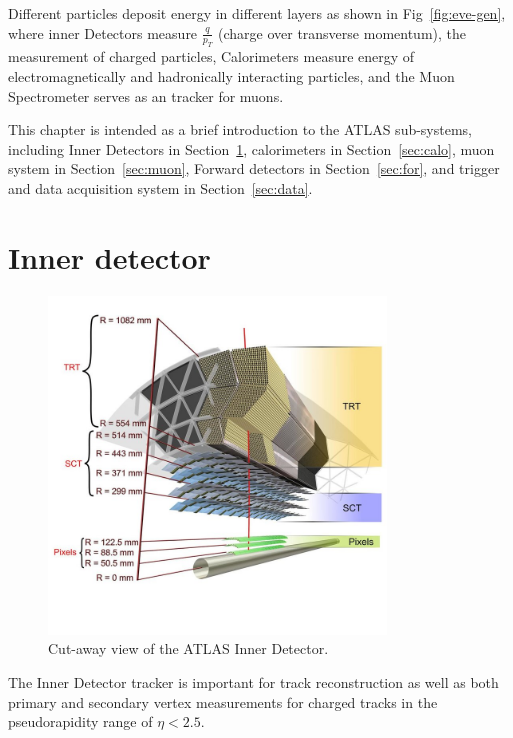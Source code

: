 \par Different particles deposit energy in different layers as shown in Fig~\ref{fig:eve-gen}, where inner Detectors measure $\frac{q}{p_T}$ (charge over transverse momentum), the measurement of charged particles, Calorimeters measure energy of electromagnetically and hadronically interacting particles, and the Muon Spectrometer serves as an tracker for muons.		 	 	 		
\par This chapter is intended as a brief introduction to the ATLAS sub-systems,
 including Inner Detectors in Section~\ref{sec:inner}, calorimeters in Section~\ref{sec:calo}, 
muon system in Section~\ref{sec:muon}, Forward detectors in Section~\ref{sec:for}, and trigger and data acquisition system in Section~\ref{sec:data}.


\section{Inner detector}
\label{sec:inner}
\begin{figure}[htbp]
 \begin{center}
 \includegraphics[width=0.8\textwidth]{chapters/c4/figures/inner}
 \end{center}
 \caption{Cut-away view of the ATLAS Inner Detector.}
 \label{fig:inner}
\end{figure}
\par The Inner Detector tracker is important for track reconstruction as well as both primary and secondary vertex measurements for charged tracks in the pseudorapidity range of $ \eta< 2.5$. 
